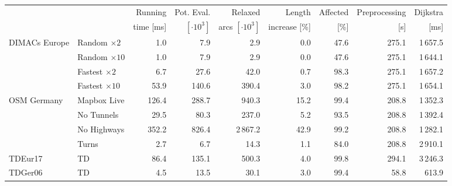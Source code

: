 \begin{tabular}{llrrrrrrr}
\toprule
 & &   Running &     Pot. Eval. &             Relaxed &        Length & Affected & Preprocessing & Dijkstra \\ & & time [ms] & $[\cdot 10^3]$ & arcs $[\cdot 10^3]$ & increase [\%] &     [\%] &           [s] &     [ms] \\
\midrule
DIMACs Europe & Random $\times 2$ &              1.0 &            7.9 &               2.9 &       0.0 &      47.6 &                         275.1 &                    1\,657.5 \\
        & Random $\times 10$ &              1.0 &            7.9 &               2.9 &       0.0 &      47.6 &                         275.1 &                    1\,644.1 \\
        & Fastest $\times 2$ &              6.7 &           27.6 &              42.0 &       0.7 &      98.3 &                         275.1 &                    1\,657.2 \\
        & Fastest $\times 10$ &             53.9 &          140.6 &             390.4 &       3.0 &      98.2 &                         275.1 &                    1\,654.1 \\
\addlinespace
OSM Germany & Mapbox Live &            126.4 &          288.7 &             940.3 &      15.2 &      99.4 &                         208.8 &                    1\,352.3 \\
        & No Tunnels &             29.5 &           80.3 &             237.0 &       5.2 &      93.5 &                         208.8 &                    1\,392.4 \\
        & No Highways &            352.2 &          826.4 &            2\,867.2 &      42.9 &      99.2 &                         208.8 &                    1\,282.1 \\
        & Turns &              2.7 &            6.7 &              14.3 &       1.1 &      84.0 &                         208.8 &                    2\,910.1 \\
\addlinespace
TDEur17 & TD &             86.4 &          135.1 &             500.3 &       4.0 &      99.8 &                         294.1 &                    3\,246.3 \\
TDGer06 & TD &              4.5 &           13.5 &              30.1 &       3.0 &      99.4 &                          58.8 &                     613.9 \\
\bottomrule
\end{tabular}

